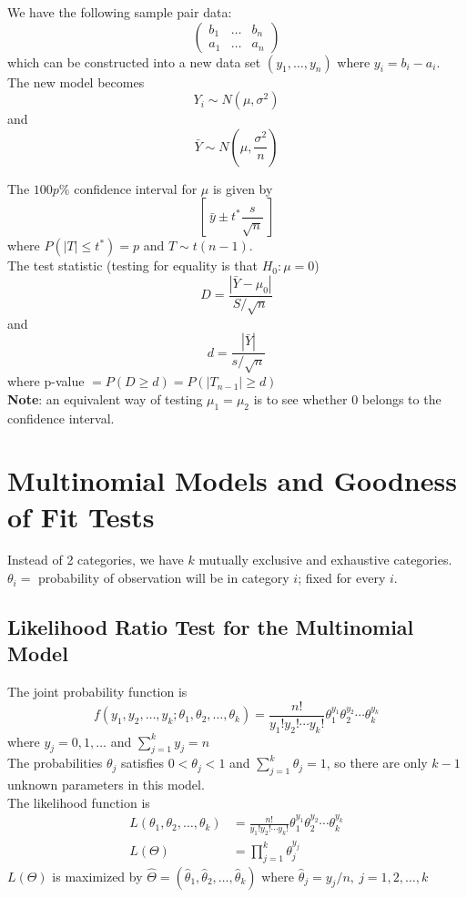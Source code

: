 \documentclass[12pt, leqno]{article}
\theoremstyle{definition}
\begin{document}
  We have the following sample pair data:
  \[
  \begin{pmatrix}
    b_{1} & \dots & b_{n} \\
    a_{1} & \dots & a_{n}
  \end{pmatrix}
  \]
  which can be constructed into a new data set $(y_1, \dots, y_n)$ where $y_i = b_i - a_i$. \\
  The new model becomes
  $$Y_{i} \sim N(\mu, \sigma^{2})$$
  and
  $$\bar{Y} \sim N(\mu, \frac{\sigma^{2}}{n})$$

  The $100p\%$ confidence interval for $\mu$ is given by
  $$\left[~\bar{y} \pm t^{*}\frac{s}{\sqrt{n}}~\right]$$
  where $P(|T| \leq t^{*}) = p$ and $T \sim t(n - 1)$. \\

  The test statistic (testing for equality is that $H_{0} : \mu = 0$)
  $$D = \frac{|\bar{Y} - \mu_{0}|}{S/\sqrt{n}}$$
  and
  $$d = \frac{|\bar{Y}|}{s/\sqrt{n}}$$
  where p-value $= P(D \geq d) = P(|T_{n-1}| \geq d)$ \\

  \textbf{Note}: an equivalent way of testing $\mu_{1} = \mu_{2}$ is to see whether 0 belongs to the confidence interval.

  \newpage
  \section{Multinomial Models and Goodness of Fit Tests}
  Instead of 2 categories, we have $k$ mutually exclusive and exhaustive categories. \\
  $\theta_{i} =$ probability of observation will be in category $i$; fixed for every $i$.
  \subsection{Likelihood Ratio Test for the Multinomial Model}
  The joint probability function is
  \[
  f(y_{1}, y_{2}, \dots, y_{k}; \theta_{1}, \theta_{2}, \dots, \theta_{k})
  =
  \frac{n!}{y_{1}!y_{2}!\cdots y_{k}!}\theta_{1}^{y_{1}}\theta_{2}^{y_{2}}\cdots\theta_{k}^{y_{k}}
  \]
  where $y_{j} = 0, 1, \dots$ and $\sum_{j=1}^{k}y_{j} = n$ \\
  The probabilities $\theta_{j}$ satisfies $0 < \theta_{j} < 1$ and $\sum_{j=1}^{k}\theta_{j} = 1$, so there are only $k - 1$ unknown parameters in this model. \\

  The likelihood function is
  \begin{align*}
    L(\theta_{1}, \theta_{2}, \dots, \theta_{k}) &=
    \frac{n!}{y_{1}!y_{2}!\cdots y_{k}!}\theta_{1}^{y_{1}}\theta_{2}^{y_{2}}\cdots\theta_{k}^{y_{k}} \\
    L(\Theta) &= \prod_{j=1}^{k}\theta_{j}^{y_{j}}
  \end{align*}
  $L(\Theta)$ is maximized by $\hat{\Theta} = (\hat{\theta}_{1}, \hat{\theta}_{2}, \dots, \hat{\theta}_{k})$ where $\hat{\theta}_{j} = y_{j} / n, ~j = 1, 2, \dots, k$ \\
\end{document}
